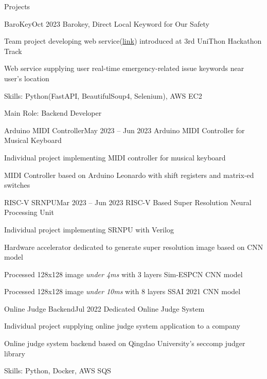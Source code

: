 \documentclass{resume}
\begin{document}
\begin{rSection}{Projects}
    \begin{rSubsection}{BaroKey}{Oct 2023}
        Barokey, Direct Local Keyword for Our Safety

        \item Team project developing web service(\href{https://github.com/UniD3-Hackathon-Team4/barokey}{link}) introduced at 3rd UniThon Hackathon Track

        \item Web service supplying user real-time emergency-related issue keywords near user's location

        \item Skills: Python(FastAPI, BeautifulSoup4, Selenium), AWS EC2

        \item Main Role: Backend Developer
    \end{rSubsection}

    \begin{rSubsection}{Arduino MIDI Controller}{May 2023 -- Jun 2023}
        Arduino MIDI Controller for Musical Keyboard

        \item Individual project implementing MIDI controller for musical keyboard

        \item MIDI Controller based on Arduino Leonardo with shift registers and matrix-ed switches
    \end{rSubsection}

    \begin{rSubsection}{RISC-V SRNPU}{Mar 2023 -- Jun 2023}
        RISC-V Based Super Resolution Neural Processing Unit

        \item Individual project implementing SRNPU with Verilog

        \item Hardware accelerator dedicated to generate super resolution image based on CNN model

        \item Processed 128x128 image \emph{under 4ms} with 3 layers Sim-ESPCN CNN model

        \item Processed 128x128 image \emph{under 10ms} with 8 layers SSAI 2021 CNN model
    \end{rSubsection}

    \begin{rSubsection}{Online Judge Backend}{Jul 2022}
        Dedicated Online Judge System

        \item Individual project supplying online judge system application to a company

        \item Online judge system backend based on Qingdao University's seccomp judger library

        \item Skills: Python, Docker, AWS SQS
    \end{rSubsection}
    
\end{rSection}
\end{document}
